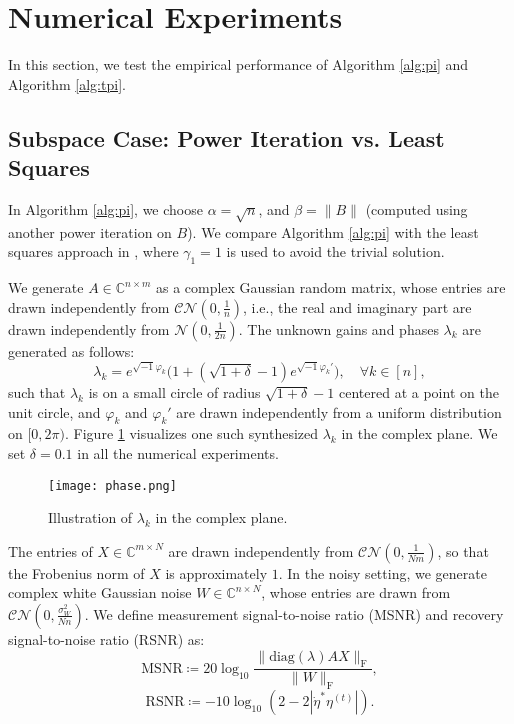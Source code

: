\documentclass[11pt,journal]{IEEEtran}
\newcommand{\bbC}{\mathbb{C}}
\newcommand{\rmF}{\mathrm{F}}
\newcommand{\calCN}{\mathcal{CN}}
\newcommand{\norm}[1]{\|{#1}\|}
\newcommand{\diag}{\mathrm{diag}}
\begin{document}
\section{Numerical Experiments} \label{sec:experiment}

In this section, we test the empirical performance of Algorithm \ref{alg:pi} and Algorithm \ref{alg:tpi}.

\subsection{Subspace Case: Power Iteration vs. Least Squares} \label{sec:exp_pi}
In Algorithm \ref{alg:pi}, we choose $\alpha = \sqrt{n}$, and $\beta = \norm{B}$ (computed using another power iteration on $B$). We compare Algorithm \ref{alg:pi} with the least squares approach in \cite[Section 3.3]{Ling2016}, where $\gamma_1 = 1$ is used to avoid the trivial solution. 

We generate $A\in\bbC^{n\times m}$ as a complex Gaussian random matrix, whose entries are drawn independently from $\calCN(0,\frac{1}{n})$, i.e., the real and imaginary part are drawn independently from $\mathcal{N}(0, \frac{1}{2n})$. The unknown gains and phases $\lambda_k$ are generated as follows:
\begin{equation}
\label{eq:lambda_exp}
\lambda_k = e^{\sqrt{-1}\varphi_k} \Big(1+(\sqrt{1+\delta}-1)e^{\sqrt{-1}\varphi_k'}\Big), \quad \forall k\in[n],
\end{equation}
such that $\lambda_k$ is on a small circle of radius $\sqrt{1+\delta}-1$ centered at a point on the unit circle, and $\varphi_k$ and $\varphi_k'$ are drawn independently from a uniform distribution on $[0,2\pi)$. Figure \ref{fig:phase} visualizes one such synthesized $\lambda_k$ in the complex plane. We set $\delta = 0.1$ in all the numerical experiments.
\begin{figure}%
\centering
\texttt{[image: phase.png]}%
\caption{Illustration of $\lambda_k$ in the complex plane.}%
\label{fig:phase}%
\end{figure}
The entries of $X\in\bbC^{m\times N}$ are drawn independently from $\calCN(0,\frac{1}{Nm})$, so that the Frobenius norm of $X$ is approximately $1$. 
In the noisy setting, we generate complex white Gaussian noise $W\in\bbC^{n\times N}$, whose entries are drawn from $\calCN(0,\frac{\sigma_W^2}{Nn})$.
We define measurement signal-to-noise ratio (MSNR) and recovery signal-to-noise ratio (RSNR) as:
\[
\text{MSNR} \coloneqq 20\log_{10} \frac{\norm{\diag(\lambda)AX}_\rmF}{\norm{W}_\rmF},
\]
\[
\text{RSNR} \coloneqq -10\log_{10}(2-2|\dot{\eta}^*\eta^{(t)}|).
\]
\end{document}
